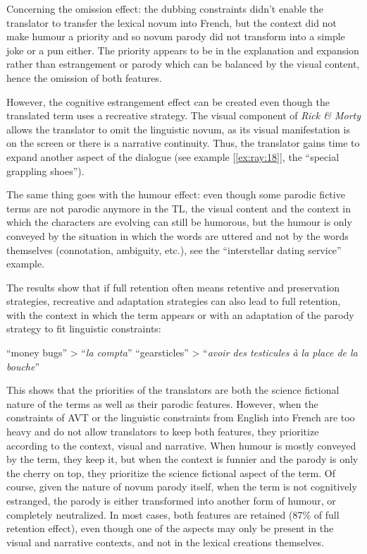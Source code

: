 \documentclass[output=paper]{langscibook}
\begin{document}
Concerning the omission effect: the dubbing constraints didn’t enable the translator to transfer the lexical novum into French, but the context did not make humour a priority and so novum parody did not transform into a simple joke or a pun either. The priority appears to be in the explanation and expansion rather than estrangement or parody which can be balanced by the visual content, hence the omission of both features.

However, the cognitive estrangement effect can be created even though the translated term uses a recreative strategy. The visual component of \textit{Rick \& Morty} allows the translator to omit the linguistic novum, as its visual manifestation is on the screen or there is a narrative continuity. Thus, the translator gains time to expand another aspect of the dialogue (see example [\ref{ex:ray:18}], the “special grappling shoes”).

The same thing goes with the humour effect: even though some parodic fictive terms are not parodic anymore in the TL, the visual content and the context in which the characters are evolving can still be humorous, but the humour is only conveyed by the situation in which the words are uttered and not by the words themselves (connotation, ambiguity, etc.), see the “interstellar dating service” example.

The results show that if full retention often means retentive and preservation strategies, recreative and adaptation strategies can also lead to full retention, with the context in which the term appears or with an adaptation of the parody strategy to fit linguistic constraints:

\ea\label{ex:ray:26} “money bugs” > “\textit{la compta}”
\z
\ea\label{ex:ray:27} “gearsticles” > “\textit{avoir des testicules à la place de la bouche}”
\z

 This shows that the priorities of the translators are both the science fictional nature of the terms as well as their parodic features. However, when the constraints of AVT or the linguistic constraints from English into French are too heavy and do not allow translators to keep both features, they prioritize according to the context, visual and narrative. When humour is mostly conveyed by the term, they keep it, but when the context is funnier and the parody is only the cherry on top, they prioritize the science fictional aspect of the term. Of course, given the nature of novum parody itself, when the term is not cognitively estranged, the parody is either transformed into another form of humour, or completely neutralized. In most cases, both features are retained (87\% of full retention effect), even though one of the aspects may only be present in the visual and narrative contexts, and not in the lexical creations themselves.
\end{document}
